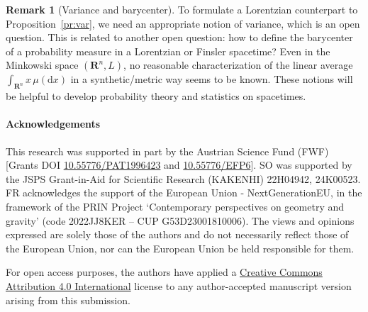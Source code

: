 \documentclass[a4paper,11pt]{article}
\numberwithin{equation}{section}
\theoremstyle{definition}
\newtheorem{remark}[definition]{Remark}
\theoremstyle{plain}
\newcommand{\R}{\mathbf R}
\newcommand{\dd}{\mathrm{d}}
\begin{document}
\begin{remark}[Variance and barycenter]\label{rm:var}
To formulate a Lorentzian counterpart to Proposition~\ref{pr:var}, we need an appropriate notion of variance, which is an open question.
This is related to another open question: how to define the barycenter of a probability measure in a Lorentzian or Finsler spacetime?
Even in the Minkowski space $(\R^n,L)$, no reasonable characterization of the linear average $\int_{\R^n} x \,\mu(\dd x)$ in a synthetic/metric way seems to be known.
These notions will be helpful to develop probability theory and statistics on spacetimes.
\end{remark}


\paragraph{Acknowledgements}
This research was supported in part by the Austrian Science Fund (FWF) [Grants DOI \href{https://doi.org/10.55776/PAT1996423}{10.55776/PAT1996423} and \href{https://doi.org/10.55776/EFP6}{10.55776/EFP6}].
SO was supported by the JSPS Grant-in-Aid for Scientific Research (KAKENHI) 22H04942, 24K00523.
FR acknowledges the support of the European Union - NextGenerationEU, in the framework of the PRIN Project `Contemporary perspectives on geometry and gravity' (code 2022JJ8KER – CUP G53D23001810006). The views and opinions expressed are solely those of the authors and do not necessarily reflect those of the European Union, nor can the European Union be held responsible for them.

For open access purposes, the authors have applied a \href{https://creativecommons.org/licenses/by/4.0/}{Creative Commons Attribution 4.0 International} license to any author-accepted manuscript version arising from this submission.
\end{document}
